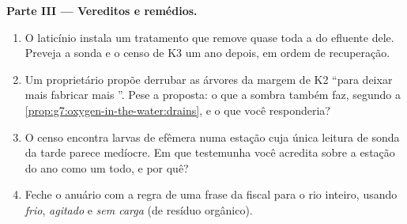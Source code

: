 \begin{problem}
\medskip\noindent\textbf{Parte III --- Vereditos e
remédios.}
\begin{enumerate}[resume]
  \item O laticínio instala um tratamento que remove quase toda a
         do efluente dele. Preveja a sonda e o censo
        de K3 um ano depois, em ordem de recuperação.
  \item Um proprietário propõe derrubar as árvores da margem de K2
        ``para deixar mais  fabricar mais ''. Pese a
        proposta: o que a sombra também faz, segundo a
        \cref{prop:g7:oxygen-in-the-water:drains}, e o que você
        responderia?
  \item O censo encontra larvas de efêmera numa estação cuja única
        leitura de sonda da tarde parece medíocre. Em que testemunha
        você acredita sobre a estação do ano como um todo, e por quê?
  \item Feche o anuário com a regra de uma frase da fiscal para o rio
        inteiro, usando \emph{frio}, \emph{agitado} e \emph{sem carga}
        (de resíduo orgânico).
\end{enumerate}
\end{problem}
